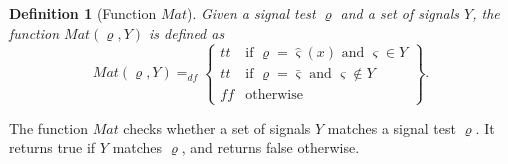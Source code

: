 \documentclass{fcs}
\newtheorem{mydef}{Definition}[section]
\newcommand{\sig}[0]{\varsigma}
\newcommand{\true}[0]{\mathit{tt}}
\newcommand{\false}[0]{\mathit{ff}}
\newcommand{\Match}[0]{\mathit{Mat}}
\newcommand{\dddef}[0]{=_{df}}
\begin{document}
\begin{mydef}[Function $\Match$]
	Given a signal test $\varrho$ and a set of signals $Y$, the function $\Match(\varrho, Y)$ is defined as
	$$
	\Match(\varrho, Y)\dddef \left\{
	\begin{array}{ll}
	\true & \mbox{if $\varrho=\hat{\sig}(x)$ and $\sig\in Y$}\\
	\true & \mbox{if $\varrho=\bar{\sig}$ and $\sig\notin Y$}\\
	\false & \mbox{otherwise}
	\end{array}
	\right\}.
	$$
\end{mydef}

The function $\Match$ checks whether a set of signals $Y$ matches a signal test $\varrho$.
It returns true if $Y$ matches $\varrho$, and returns false otherwise.
\end{document}
